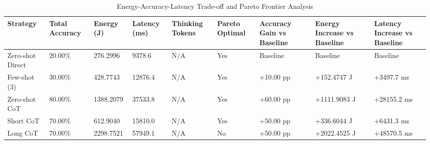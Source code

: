 \begin{table}
\caption{Energy-Accuracy-Latency Trade-off and Pareto Frontier Analysis}
\label{tab:tradeoff_comparison}
\begin{tabular}{lllllllll}
\toprule
Strategy & Total Accuracy & Energy (J) & Latency (ms) & Thinking Tokens & Pareto Optimal & Accuracy Gain vs Baseline & Energy Increase vs Baseline & Latency Increase vs Baseline \\
\midrule
Zero-shot Direct & 20.00\% & 276.2996 & 9378.6 & N/A & Yes & Baseline & Baseline & Baseline \\
Few-shot (3) & 30.00\% & 428.7743 & 12876.4 & N/A & Yes & +10.00 pp & +152.4747 J & +3497.7 ms \\
Zero-shot CoT & 80.00\% & 1388.2079 & 37533.8 & N/A & Yes & +60.00 pp & +1111.9083 J & +28155.2 ms \\
Short CoT & 70.00\% & 612.9040 & 15810.0 & N/A & Yes & +50.00 pp & +336.6044 J & +6431.3 ms \\
Long CoT & 70.00\% & 2298.7521 & 57949.1 & N/A & No & +50.00 pp & +2022.4525 J & +48570.5 ms \\
\bottomrule
\end{tabular}
\end{table}
